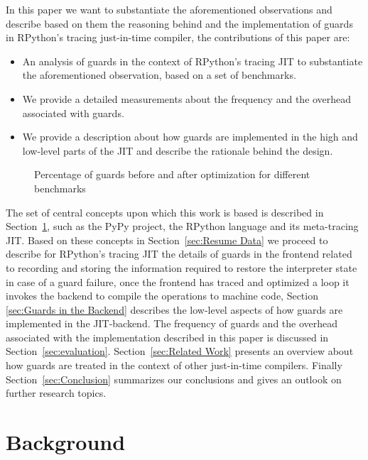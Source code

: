 \documentclass[10pt,preprint]{sigplanconf}
\newcommand\bivab[1]{\nb{DAVID}{#1}}
\begin{document}
In this paper we want to substantiate the aforementioned observations and
describe based on them the reasoning behind and the implementation of guards in
RPython's tracing just-in-time compiler, the contributions of this paper are:
\begin{itemize}
  \item An analysis of guards in the context of RPython's tracing JIT to
  substantiate the aforementioned observation, based on a set of benchmarks.
  \item We provide a detailed measurements about the frequency and the
  overhead associated with guards.
  \item We provide a description about how guards are implemented in the high\-
  and low-level parts of the JIT and describe the rationale behind the design.
\end{itemize}
\begin{figure}
    
    \caption{Percentage of guards before and after optimization for different benchmarks}
    \label{fig:guard_percent}
\end{figure}

The set of central concepts upon which this work is based is described in
Section~\ref{sec:Background}, such as the PyPy project, the RPython language
and its meta-tracing JIT. Based on these concepts in Section~\ref{sec:Resume
Data} we proceed to describe for RPython's tracing JIT the details of guards in
the frontend\bivab{better term for this?} related to recording and storing the
information required to restore the interpreter state in case of a guard
failure, once the frontend has traced and optimized a loop it invokes the
backend to compile the operations to machine code, Section \ref{sec:Guards in
the Backend} describes the low-level aspects of how guards are implemented in
the JIT-backend. The frequency of guards and the overhead associated with the
implementation described in this paper is discussed in
Section~\ref{sec:evaluation}. Section~\ref{sec:Related Work} presents an
overview about how guards are treated in the context of other just-in-time
compilers. Finally Section~\ref{sec:Conclusion} summarizes our conclusions and
gives an outlook on further research topics.


\section{Background}
\label{sec:Background}
\end{document}
